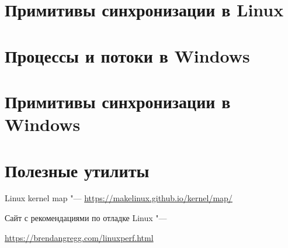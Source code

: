 \documentclass[bachelor, och, book]{SCWorks}
\theoremstyle{remark}
\begin{document}
    \section{Примитивы синхронизации в Linux}
    \section{Процессы и потоки в Windows}
    \section{Примитивы синхронизации в Windows}

    \section{Полезные утилиты}

    Linux kernel map "--- \href{https://makelinux.github.io/kernel/map/}{https://makelinux.github.io/kernel/map/}

    Сайт с рекомендациями  по отладке Linux "--- 
    
    \href{https://brendangregg.com/linuxperf.html}{https://brendangregg.com/linuxperf.html}
\end{document}
